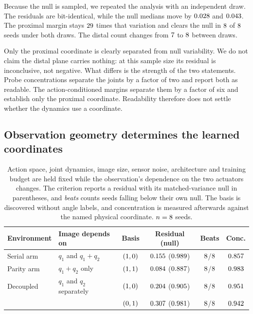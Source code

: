 \documentclass{article}
\begin{document}
Because the null is sampled, we repeated the analysis with an independent draw. The residuals are bit-identical, while the null medians move by $0.028$ and $0.043$. The proximal margin stays $29$ times that variation and clears the null in $8$ of $8$ seeds under both draws. The distal count changes from $7$ to $8$ between draws. \HORIZONPARA

Only the proximal coordinate is clearly separated from null variability. We do not claim the distal plane carries nothing: at this sample size its residual is inconclusive, not negative. What differs is the strength of the two statements. Probe concentrations separate the joints by a factor of two and report both as readable. The action-conditioned margins separate them by a factor of six and establish only the proximal coordinate. Readability therefore does not settle whether the dynamics use a coordinate.

\subsection{Observation geometry determines the learned coordinates}
\label{sec:built}

\begin{table}[t]
\centering
\small
\caption{
Action space, joint dynamics, image size, sensor noise, architecture and training budget are held fixed while the observation's dependence on the two actuators changes. The criterion reports a residual with its matched-variance null in parentheses, and \emph{beats} counts seeds falling below their own null. The basis is discovered without angle labels, and concentration is measured afterwards against the named physical coordinate. $n=8$ seeds.
}
\label{tab:envs}
\begin{tabular}{llcccc}
\toprule
Environment & Image depends on & Basis & Residual (null) & Beats & Conc. \\
\midrule
Serial arm
& $q_1$ and $q_1{+}q_2$
& $(1,0)$
& $0.155$ ($0.989$)
& $8$/$8$
& $0.857$ \\
Parity arm
& $q_1{+}q_2$ only
& $(1,1)$
& $0.084$ ($0.887$)
& $8$/$8$
& $0.983$ \\
Decoupled
& $q_1$ and $q_2$ separately
& $(1,0)$
& $0.204$ ($0.905$)
& $8$/$8$
& $0.951$ \\
&
&
$(0,1)$
& $0.307$ ($0.981$)
& $8$/$8$
& $0.942$ \\
\bottomrule
\end{tabular}
\end{table}
\end{document}
